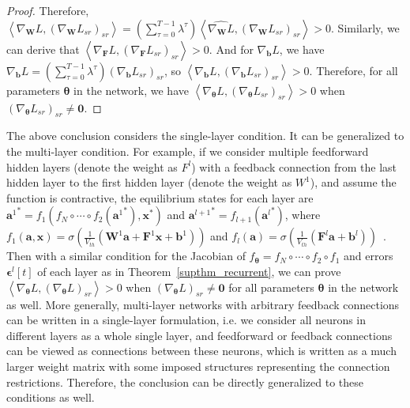 \documentclass{article}
\begin{document}
\begin{proof}
Therefore, $\left<\nabla_{\mathbf{W}}L, \left(\nabla_{\mathbf{W}}L_{sr}\right)_{sr}\right> = \left(\sum_{\tau=0}^{T-1}\lambda^\tau\right)\left<\widehat{\nabla_{\mathbf{W}}L}, \left(\nabla_{\mathbf{W}}L_{sr}\right)_{sr}\right> > 0$. Similarly, we can derive that $\left<\nabla_{\mathbf{F}}L, \left(\nabla_{\mathbf{F}}L_{sr}\right)_{sr}\right> > 0$. And for $\nabla_{\mathbf{b}}L$, we have $\nabla_{\mathbf{b}}L=\left(\sum_{\tau=0}^{T-1}\lambda^\tau\right)\left(\nabla_{\mathbf{b}}L_{sr}\right)_{sr}$, so $\left<\nabla_{\mathbf{b}}L, \left(\nabla_{\mathbf{b}}L_{sr}\right)_{sr}\right> > 0$. Therefore, for all parameters $\bm{\theta}$ in the network, we have $\left<\nabla_{\bm{\theta}}L, \left(\nabla_{\bm{\theta}}L_{sr}\right)_{sr}\right> > 0$ when $\left(\nabla_{\bm{\theta}}L_{sr}\right)_{sr}\neq\mathbf{0}$.

\end{proof}

\begin{remark}
The above conclusion considers the single-layer condition. It can be generalized to the multi-layer condition. For example, if we consider multiple feedforward hidden layers (denote the weight as $F^l$) with a feedback connection from the last hidden layer to the first hidden layer (denote the weight as $W^1$), and assume the function is contractive, the equilibrium states for each layer are ${\mathbf{a}^1}^* = f_1\left(f_N\circ\cdots\circ f_2({\mathbf{a}^1}^*), \mathbf{x^*}\right)$ and ${\mathbf{a}^{l+1}}^*=f_{l+1}({\mathbf{a}^l}^*)$, where $f_1(\mathbf{a}, \mathbf{x})=\sigma\left(\frac{1}{V_{th}}(\mathbf{W}^1\mathbf{a}+\mathbf{F}^1\mathbf{x}+\mathbf{b}^1)\right)$ and $f_{l}(\mathbf{a}) = \sigma\left(\frac{1}{V_{th}}(\mathbf{F}^{l}\mathbf{a}+\mathbf{b}^{l})\right)$~\cite{xiao2021training}. Then with a similar condition for the Jacobian of $f_{\bm{\theta}}=f_N\circ\cdots\circ f_2\circ f_1$ and errors $\bm{\epsilon}^l[t]$ of each layer as in Theorem~\ref{supthm_recurrent}, we can prove $\left<\nabla_{\bm{\theta}}L, \left(\nabla_{\bm{\theta}}L\right)_{sr}\right> > 0$ when $\left(\nabla_{\bm{\theta}}L\right)_{sr}\neq\mathbf{0}$ for all parameters $\bm{\theta}$ in the network as well.
More generally, multi-layer networks with arbitrary feedback connections can be written in a single-layer formulation, i.e. we consider all neurons in different layers as a whole single layer, and feedforward or feedback connections can be viewed as connections between these neurons, which is written as a much larger weight matrix with some imposed structures representing the connection restrictions. Therefore, the conclusion can be directly generalized to these conditions as well.
\end{remark}
\end{document}
